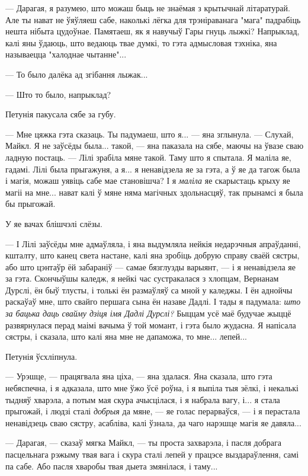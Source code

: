 --- Дарагая, я разумею, што можаш быць не знаёмая з крытычнай літаратурай. Але ты нават не 
ўяўляеш сабе, наколькі лёгка для трэніраванага "мага" падрабіць нешта нібыта цудоўнае.
Памятаеш, як я навучыў Гары гнуць лыжкі? Напрыклад, калі яны ўдаюць, што ведаюць твае думкі,
то гэта адмысловая тэхніка, яна называецца "халоднае чытанне"...

--- То было далёка ад згібання лыжак...

--- Што то было, напрыклад?

Петунія пакусала сябе за губу.

--- Мне цяжка гэта сказаць. Ты падумаеш, што я... --- яна зглынула. --- Слухай, Майкл. Я не 
заўсёды была... такой, --- яна паказала на сябе, маючы на ўвазе сваю ладную постаць. --- Лілі
зрабіла мяне такой. Таму што я спытала. Я маліла яе, гадамі. Лілі была прыгажуня, а я...
я ненавідзела яе за гэта, а ў яе да тагож была і магія, можаш уявіць сабе мае становішча?
І я \emph{маліла} яе скарыстаць крыху яе магіі на мне... нават калі ў мяне няма магічных
здольнасцяў, так прынамсі я была бы прыгожай.

У яе вачах блішчэлі слёзы.

--- І Лілі заўсёды мне адмаўляла, і яна выдумляла нейкія недарэчныя апраўданні, кшталту, што 
канец света настане, калі яна зробіць добрую справу сваёй сястры, або што цэнтаўр ёй забараніў ---
самае бязглузды варыянт, --- і я ненавідзела яе за гэта. Скончыўшы каледж, я нейкі час сустракалася
з хлопцам, Вернанам Дурслі, ён быў тлусты, і толькі ён размаўляў са мной у каледжы. І ён 
аднойчы раскаўаў мне, што свайго першага сына ён назаве Дадлі. І тады я падумала: \emph{што за
бацька даць свайму дзіця імя Дадлі Дурслі?} Быццам усё маё будучае жыццё развярнулася перад
маімі вачыма ў той момант, і гэта было жудасна. Я напісала сястры, і сказала, што калі яна мне 
не дапаможа, то мне... лепей...

Петунія ўсхліпнула.

--- Урэшце, --- працягвала яна ціха, --- яна здалася. Яна сказала, што гэта небяспечна, і я
адказала, што мне ўжо ўсё роўна, і я выпіла тыя зёлкі, і некалькі тыдняў хварэла, а потым мая
скура ачысцілася, і я набрала вагу, і... я стала прыгожай, і людзі сталі \emph{добрыя} да мяне, ---
яе голас перарваўся, --- і я перастала ненавідзець сваю сястру, асабліва, калі ўзнала, да
чаго нарэшце магія яе давяла...

--- Дарагая, --- сказаў мягка Майкл, --- ты проста захварэла, і пасля добрага пасцельнага 
рэжыму твая вага і скура сталі лепей у працэсе выздараўлення, самі па сабе. Або пасля хваробы
твая дыета змянілася, і таму...

